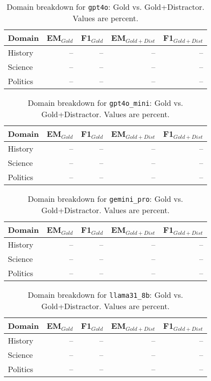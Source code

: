 \begin{table}[t]\centering
\caption{Domain breakdown for \texttt{gpt4o}: Gold vs. Gold+Distractor. Values are percent.}
\label{tab:domain-gpt4o}
\begin{tabular}{lrrrr}
\toprule
Domain & EM$_{Gold}$ & F1$_{Gold}$ & EM$_{Gold+Dist}$ & F1$_{Gold+Dist}$ \\
\midrule
History & -- & -- & -- & -- \\
Science & -- & -- & -- & -- \\
Politics & -- & -- & -- & -- \\
\bottomrule
\end{tabular}
\end{table}

\begin{table}[t]\centering
\caption{Domain breakdown for \texttt{gpt4o_mini}: Gold vs. Gold+Distractor. Values are percent.}
\label{tab:domain-gpt4o_mini}
\begin{tabular}{lrrrr}
\toprule
Domain & EM$_{Gold}$ & F1$_{Gold}$ & EM$_{Gold+Dist}$ & F1$_{Gold+Dist}$ \\
\midrule
History & -- & -- & -- & -- \\
Science & -- & -- & -- & -- \\
Politics & -- & -- & -- & -- \\
\bottomrule
\end{tabular}
\end{table}

\begin{table}[t]\centering
\caption{Domain breakdown for \texttt{gemini_pro}: Gold vs. Gold+Distractor. Values are percent.}
\label{tab:domain-gemini_pro}
\begin{tabular}{lrrrr}
\toprule
Domain & EM$_{Gold}$ & F1$_{Gold}$ & EM$_{Gold+Dist}$ & F1$_{Gold+Dist}$ \\
\midrule
History & -- & -- & -- & -- \\
Science & -- & -- & -- & -- \\
Politics & -- & -- & -- & -- \\
\bottomrule
\end{tabular}
\end{table}

\begin{table}[t]\centering
\caption{Domain breakdown for \texttt{llama31_8b}: Gold vs. Gold+Distractor. Values are percent.}
\label{tab:domain-llama31_8b}
\begin{tabular}{lrrrr}
\toprule
Domain & EM$_{Gold}$ & F1$_{Gold}$ & EM$_{Gold+Dist}$ & F1$_{Gold+Dist}$ \\
\midrule
History & -- & -- & -- & -- \\
Science & -- & -- & -- & -- \\
Politics & -- & -- & -- & -- \\
\bottomrule
\end{tabular}
\end{table}

